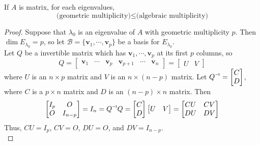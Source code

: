 \begin{lemma}
	If $ A $ is \nbyn matrix, for each eigenvalues,
	$$ \text{(geometric multiplicity)} \leq \text{(algebraic multiplicity)} $$
\end{lemma}
\begin{proof}
	Suppose that $\lambda_0$ is an eigenvalue of $A$ with geometric multiplicity $p$. Then $\dim{E_{\lambda_0}} = p$, so let $\mathcal{B} = \{\textbf{v}_1, \cdots, \textbf{v}_p\}$ be a basis for $E_{\lambda_0}$. \\
	
	Let $Q$ be a invertible \nbyn matrix which has $\textbf{v}_1, \cdots, \textbf{v}_p$ at its first $p$ columns, so \begin{equation*}
		Q = \begin{bmatrix}
		\textbf{v}_1 & \cdots & \textbf{v}_p & \textbf{v}_{p+1} & \cdots & \textbf{v}_n
		\end{bmatrix} = \begin{bmatrix}
		U & V
		\end{bmatrix}
	\end{equation*} where $U$ is an $n \times p$ matrix and $V$ is an $n \times (n-p)$ matrix. Let $\inv{Q} = \begin{bmatrix}
		C \\ D
	\end{bmatrix}$, where $C$ is a $p \times n$ matrix and $D$ is an $(n-p) \times n$ matrix. Then \begin{align*}
		\begin{bmatrix}
			I_p & O \\ O & I_{n-p}
		\end{bmatrix} = I_n = \inv{Q}Q = \begin{bmatrix}
			C \\ D
		\end{bmatrix} \begin{bmatrix}
			U & V
		\end{bmatrix} = \begin{bmatrix}
			CU & CV \\ DU & DV
		\end{bmatrix}
	\end{align*} Thus, $CU = I_p$, $CV = O$, $DU = O$, and $DV = I_{n-p}$. \\
	

\end{proof}
